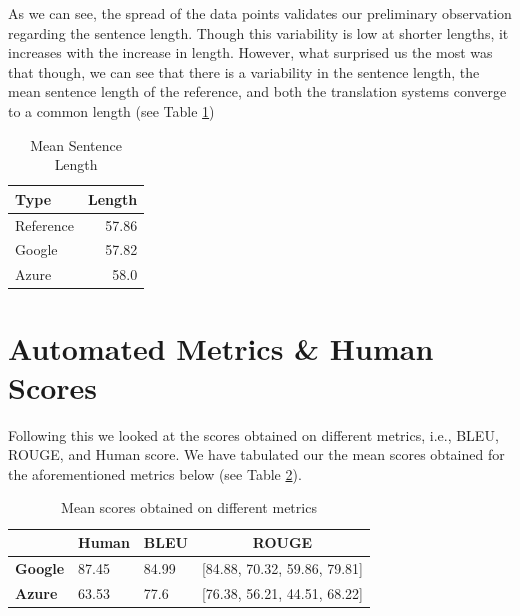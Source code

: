 As we can see, the spread of the data points validates our preliminary observation regarding the sentence length. Though this variability is low at shorter lengths, it increases with the increase in length. However, what surprised us the most was that though, we can see that there is a variability in the sentence length, the mean sentence length of the reference, and both the translation systems converge to a common length (see Table \ref{tab:sen-len})

\begin{center}    
\begin{table}[h]
\setlength\extrarowheight{5pt}
\centering
\begin{tabular}{p{4cm}@{}r}
    \textbf{Type} & \textbf{Length} \\
    \hline
    Reference & 57.86 \\
    Google & 57.82 \\
    Azure & 58.0
\end{tabular}
\caption{Mean Sentence Length}
\label{tab:sen-len}
\end{table}
\end{center}

\section{Automated Metrics \& Human Scores}

Following this we looked at the scores obtained on different metrics, i.e., BLEU, ROUGE, and Human score. We have tabulated our the mean scores obtained for the aforementioned metrics below (see Table \ref{tab:score}).

\begin{center}
    \begin{table}[h]
    \setlength\extrarowheight{10pt}
        \centering
        \begin{tabular}{p{3cm}@{}p{3cm}@{}p{3cm}@{}c}
             & \textbf{Human} & \textbf{BLEU} & \textbf{ROUGE} \\
             \hline
            \textbf{Google} & 87.45 & 84.99 & [84.88, 70.32, 59.86, 79.81] \\
            \textbf{Azure} & 63.53 & 77.6 & [76.38, 56.21, 44.51, 68.22]
 \\ 
        \end{tabular}
        \caption{Mean scores obtained on different metrics}
        \label{tab:score}
    \end{table}
\end{center}


